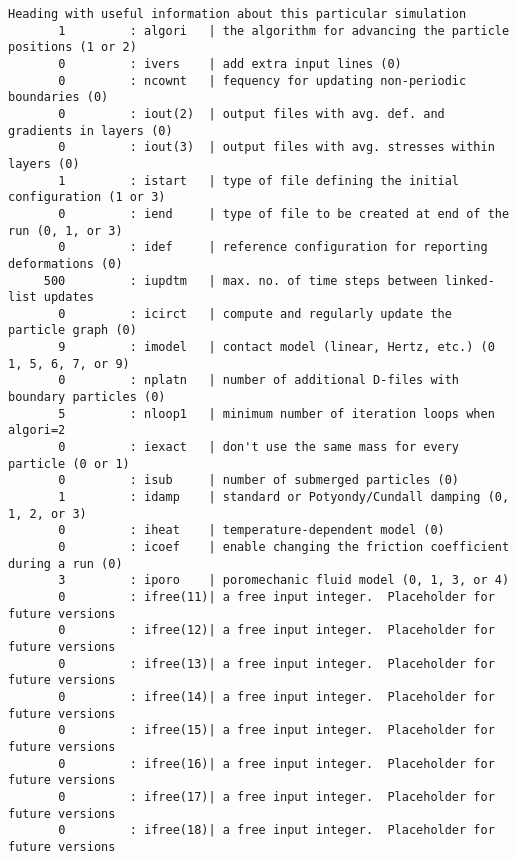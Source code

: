 \begin{verbatim}
Heading with useful information about this particular simulation
       1         : algori   | the algorithm for advancing the particle positions (1 or 2)
       0         : ivers    | add extra input lines (0)
       0         : ncownt   | fequency for updating non-periodic boundaries (0)
       0         : iout(2)  | output files with avg. def. and gradients in layers (0)
       0         : iout(3)  | output files with avg. stresses within layers (0)
       1         : istart   | type of file defining the initial configuration (1 or 3)
       0         : iend     | type of file to be created at end of the run (0, 1, or 3)
       0         : idef     | reference configuration for reporting deformations (0)
     500         : iupdtm   | max. no. of time steps between linked-list updates
       0         : icirct   | compute and regularly update the particle graph (0)
       9         : imodel   | contact model (linear, Hertz, etc.) (0 1, 5, 6, 7, or 9)
       0         : nplatn   | number of additional D-files with boundary particles (0)
       5         : nloop1   | minimum number of iteration loops when algori=2
       0         : iexact   | don't use the same mass for every particle (0 or 1)
       0         : isub     | number of submerged particles (0)
       1         : idamp    | standard or Potyondy/Cundall damping (0, 1, 2, or 3)
       0         : iheat    | temperature-dependent model (0)
       0         : icoef    | enable changing the friction coefficient during a run (0)
       3         : iporo    | poromechanic fluid model (0, 1, 3, or 4)
       0         : ifree(11)| a free input integer.  Placeholder for future versions
       0         : ifree(12)| a free input integer.  Placeholder for future versions
       0         : ifree(13)| a free input integer.  Placeholder for future versions
       0         : ifree(14)| a free input integer.  Placeholder for future versions
       0         : ifree(15)| a free input integer.  Placeholder for future versions
       0         : ifree(16)| a free input integer.  Placeholder for future versions
       0         : ifree(17)| a free input integer.  Placeholder for future versions
       0         : ifree(18)| a free input integer.  Placeholder for future versions
\end{verbatim}
